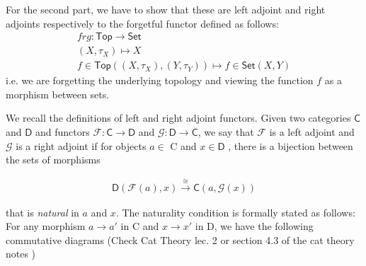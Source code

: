 \begin{frame}
    
For the second part, we have to show that these are left adjoint and right
adjoints respectively to the forgetful functor defined as follows: 
\begin{gather*}
    frg : \textsf{Top} \to \textsf{Set} \\
    (X, \tau_X ) \mapsto X \\
    f \in \textsf{Top}((X,\tau_X),(Y,\tau_Y )) \mapsto f \in \textsf{Set}(X,Y) 
\end{gather*}
i.e. we are forgetting the underlying topology and viewing the function \(f\) as a
morphism between sets. 
\end{frame}
\begin{frame}
    
We recall the definitions of left and right adjoint functors. Given two
categories \(\textsf{C}\) and \(\textsf{D}\) and functors \(\mathcal{F}:
\textsf{C} \to \textsf{D}\) and \(\mathcal{G}: \textsf{D} \to \textsf{C}\), we
say that \(\mathcal{F}\) is a left adjoint and \(\mathcal{G}\) is a right
adjoint if for objects \(a \in\) \textsf{C} and \(x \in\textsf{D}\) , there
is a bijection between the sets of morphisms 

\begin{gather*}
    \textsf{D}(\mathcal{F}(a) , x) \xrightarrow{\cong} \textsf{C}(a,
    \mathcal{G}(x))
\end{gather*}

that is \textit{natural} in \(a\) and \(x\). The naturality condition is
formally stated as follows: For any morphism \(a \to a'\) in \textsf{C} and \(x
\to x'\) in \textsf{D}, we have the following commutative diagrams (Check Cat
Theory lec. 2 or section 4.3 of the cat theory notes ) %
    \begin{center}
    \end{center}
\end{frame}

